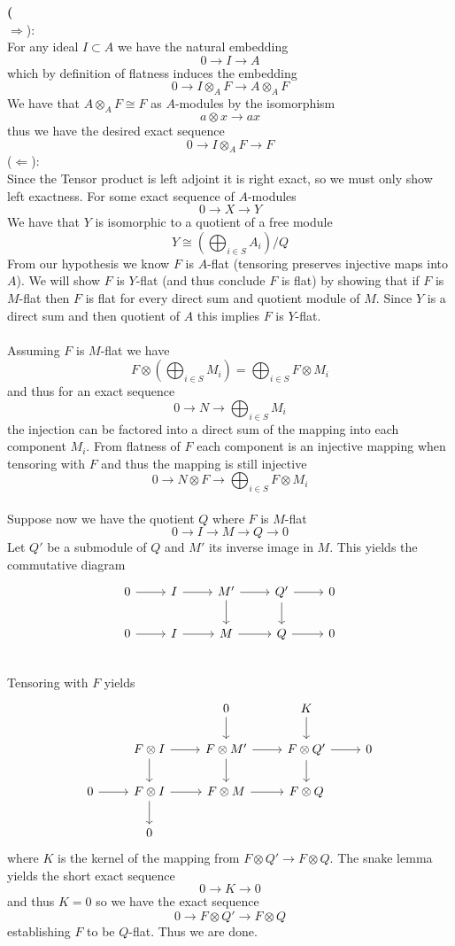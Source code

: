 \documentclass[12pt]{article}
\newenvironment{ques}[1]{\textbf{#1}\vspace{1 mm}\\ }{\bigskip}
\theoremstyle{definition}
\renewcommand{\l}{\left }
\renewcommand{\r}{\right }
\newcommand{\tensor}{\otimes}
\begin{document}
\begin{ques}{3}
	($\Rightarrow$):\\
	For any ideal $I \subset A$ we have the natural embedding 
	$$0 \to I \to A$$
	which by definition of flatness induces the embedding
	$$0 \to I \otimes_A F \to  A \otimes_A F$$
	We have that $A \otimes_A F \cong F$ as $A$-modules by the isomorphism
	$$a \tensor x \to ax$$
	thus we have the desired exact sequence 
	$$0 \to I \otimes_A F \to  F$$
	($\Leftarrow$):\\
	Since the Tensor product is left adjoint it is right exact, so we must only
	show left exactness. For some exact sequence of $A$-modules
	$$0 \to X \to Y$$
	We have that $Y$ is isomorphic to a quotient of a free module
	$$Y \cong \l(\bigoplus_{i \in S} A_i\r) /Q$$
	From our hypothesis we know $F$ is $A$-flat (tensoring preserves injective
	maps into $A$). We will show $F$ is $Y$-flat (and thus conclude $F$ is
	flat) by showing that if $F$ is $M$-flat then $F$ is flat for every direct
	sum and quotient module of $M$. Since $Y$ is a direct sum and then quotient
	of $A$ this implies $F$ is $Y$-flat.\\
	\\
	Assuming $F$ is $M$-flat we have
	$$F \tensor \l(\bigoplus_{i \in S} M_i\r) = \bigoplus_{i \in S} F \tensor M_i$$
	and thus for an exact sequence
	$$0 \to N \to \bigoplus_{i \in S} M_i$$
	the injection can be factored into a direct sum of the mapping into each
	component $M_i$. From flatness
	of $F$ each component is an injective mapping when tensoring with $F$ and
	thus the mapping is still injective
	$$0 \to N \tensor F \to \bigoplus_{i \in S} F \tensor M_i$$
	\\
	Suppose now we have the quotient $Q$ where $F$ is $M$-flat
	$$0 \to I \to M \to Q \to 0$$
	Let $Q'$ be a submodule of $Q$ and $M'$ its inverse image in $M$. This
	yields the commutative diagram
	$$\begin{tikzcd}
	0 \arrow[r] & I \arrow[r] & M' \arrow[d]\arrow[r] & Q' \arrow[d]\arrow[r] & 0\\
	0 \arrow[r] & I \arrow[r] & M \arrow[r] & Q \arrow[r] & 0\\
	\end{tikzcd}$$
	Tensoring with $F$ yields
	$$\begin{tikzcd}
	& & 0 \arrow[d] & K \arrow[d] & \\
	 & F \tensor I \arrow[r]\arrow[d] & F \tensor M' \arrow[d]\arrow[r] & F \tensor Q'
	 \arrow[d]\arrow[r] & 0\\
	0 \arrow[r]& F \tensor I \arrow[d] \arrow[r] & F \tensor M \arrow[r] & F
	\tensor Q&\\
	 & 0 & &
	\end{tikzcd}$$
	where $K$ is the kernel of the mapping from $F \tensor Q' \to F \tensor Q$.
	The snake lemma yields the short exact sequence
	$$0 \to K \to 0$$
	and thus $K = 0$ so we have the exact sequence
	$$0 \to F \tensor Q' \to F \tensor Q$$
	establishing $F$ to be $Q$-flat. Thus we are done.

\end{ques}
\end{document}
